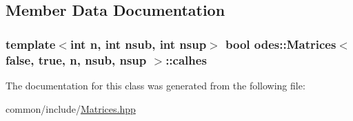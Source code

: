 \subsection{Member Data Documentation}
\hypertarget{classodes_1_1Matrices_3_01false_00_01true_00_01n_00_01nsub_00_01nsup_01_4_a69754fb4b71b97a43059ba4cd1d1afee}{
\subsubsection[{calhes}]{\setlength{\rightskip}{0pt plus 5cm}template$<$int n, int nsub, int nsup$>$ bool {\bf odes\-::\-Matrices}$<$ false, true, n, nsub, nsup $>$\-::calhes\hspace{0.3cm}{\ttfamily [protected]}}}\label{classodes_1_1Matrices_3_01false_00_01true_00_01n_00_01nsub_00_01nsup_01_4_a69754fb4b71b97a43059ba4cd1d1afee}


The documentation for this class was generated from the following file\-:\begin{DoxyCompactItemize}
\item 
common/include/\hyperlink{Matrices_8hpp}{Matrices.\-hpp}\end{DoxyCompactItemize}
